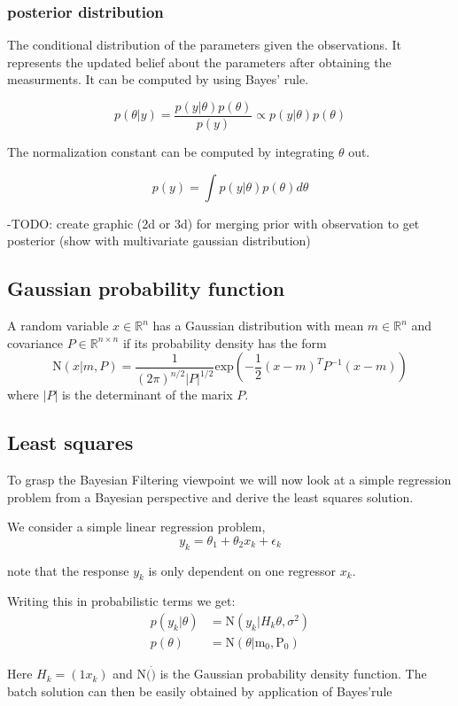\subsubsection{posterior distribution}
The conditional distribution of the parameters given the observations.
It represents the updated belief about the parameters
after obtaining the measurments. It can be computed by using Bayes' rule.

$$ p(\theta | y) = \frac{p(y | \theta) p(\theta)}{p(y)}
\propto p(y | \theta) p(\theta) $$

The normalization constant can be computed by integrating $\theta$ out.

$$ p(y) = \int p(y | \theta) p(\theta) d\theta $$

-TODO: create graphic (2d or 3d) for merging prior with observation to get
    posterior (show with multivariate gaussian distribution)

\subsection{Gaussian probability function}
A random variable $x \in \mathbb{R}^n$ has a Gaussian distribution with mean
$m \in \mathbb{R}^n$ and covariance $P \in \mathbb{R}^{n\times n}$ if its
probability density has the form
$$ \text{N}(x | m, P) = \frac{1}{(2\pi)^{n / 2} |P|^{1/2}}
\text{exp} \left( -\frac{1}{2} (x - m)^T P^{-1} (x-m) \right) $$
where $|P|$ is the determinant of the marix $P$.
    
\subsection{Least squares}
To grasp the Bayesian Filtering viewpoint we will now look
at a simple regression problem from a Bayesian perspective
and derive the least squares solution.

We consider a simple linear regression problem,
$$ y_k = \theta_1 + \theta_2 x_k + \epsilon_k $$

note that the response $y_k$ is only dependent on one regressor $x_k$.

Writing this in probabilistic terms we get:
\begin{align}
  p(y_k | \theta) &= \text{N}(y_k | H_k \theta, \sigma^2) \\
  p(\theta) &= \text{N}(\theta | \text{m}_0, \text{P}_0)
\end{align}

Here $H_k = (1 x_k)$ and N$(\dot)$ is the Gaussian probability density function.
The batch solution can then be easily obtained by application of Bayes'rule

